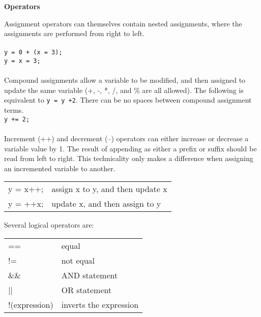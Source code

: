 \documentclass[10pt]{article}
\begin{document}
\begin{centering}
\color{blue}\textbf{Operators}\color{black}
\end{centering}
\begin{flushleft}\justify
Assignment operators can themselves contain nested assignments, where the assignments are performed from right to left.\\
\\
\color{red}\texttt{y = 0 + (x = 3);}\color{black}\\
\color{red}\texttt{y = x = 3;}\color{black}\\
\\
Compound assignments allow a variable to be modified, and then assigned to update the same variable (+, -, *, /, and \% are all allowed). The following is equivalent to \texttt{y = y +2}. There can be no spaces between compound assignment terms.
\\
\color{red}\texttt{y += 2;}\color{black}\\
\\
Increment (++) and decrement (--) operators can either increase or decrease a variable value by 1. The result of appending as either a prefix or suffix should be read from left to right. This technicality only makes a difference when assigning an incremented variable to another.

\begin{center}
\begin{tabular}{l l}
y = x++; & assign x to y, and then update x\\
y = ++x; & update x, and then assign to y\\
\end{tabular}
\end{center}

Several logical operators are:

\begin{center}
\begin{tabular}{l l}
== & equal\\
!= & not equal\\
\&\& & AND statement\\
|| & OR statement\\
!(expression) & inverts the expression\\
\end{tabular}
\end{center}


\end{flushleft}
\end{document}
